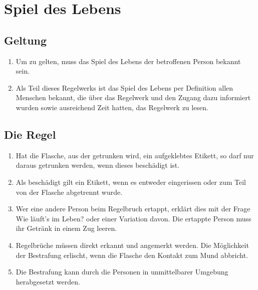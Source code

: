 \chapter{Spiel des Lebens}
\section{Geltung}
\begin{enumerate}[label={(\arabic*)}]
    \item
    Um zu gelten, muss das Spiel des Lebens der betroffenen Person bekannt sein.

    \item
    Als Teil dieses Regelwerks ist das Spiel des Lebens per Definition allen Menschen bekannt, die über das Regelwerk und den Zugang dazu informiert wurden sowie ausreichend Zeit hatten, das Regelwerk zu lesen. 
\end{enumerate}

\section{Die Regel}
\begin{enumerate}[label={(\arabic*)}]
    \item
    Hat die Flasche, aus der getrunken wird, ein aufgeklebtes Etikett, so darf nur daraus getrunken werden, wenn dieses beschädigt ist.

    \item
    Als beschädigt gilt ein Etikett, wenn es entweder eingerissen oder zum Teil von der Flasche abgetrennt wurde.

    \item
    Wer eine andere Person beim Regelbruch ertappt, erklärt dies mit der Frage \glqq{}Wie läuft's im Leben?\grqq{} oder einer Variation davon.
    Die ertappte Person muss ihr Getränk in einem Zug leeren.

    \item
    Regelbrüche müssen direkt erkannt und angemerkt werden.
    Die Möglichkeit der Bestrafung erlischt, wenn die Flasche den Kontakt zum Mund abbricht.

    \item
    Die Bestrafung kann durch die Personen in unmittelbarer Umgebung herabgesetzt werden.
\end{enumerate}
